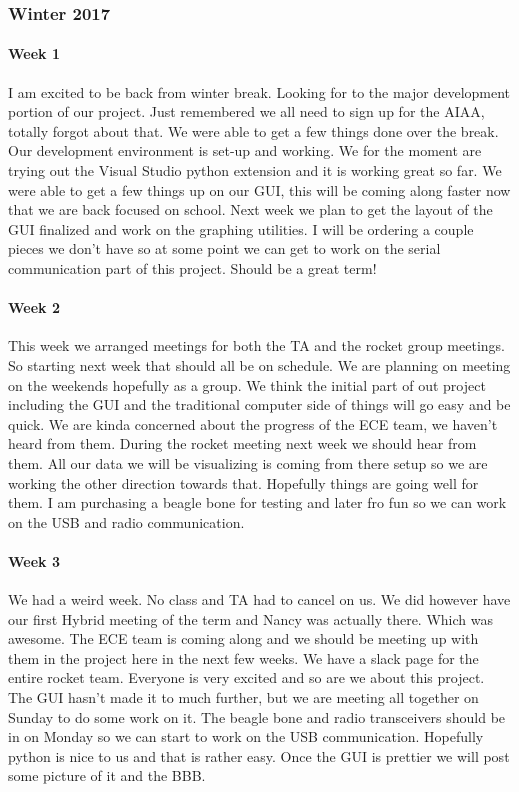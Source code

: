 \documentclass[10pt,draftclsnofoot,onecolumn,retainorgcmds]{IEEEtran}
\begin{document}
\subsubsection{Winter 2017}
\paragraph{Week 1}
I am excited to be back from winter break. Looking for to the major development portion of our project. Just remembered we all need to sign up for the AIAA, totally forgot about that. We were able to get a few things done over the break. Our development environment is set-up and working. We for the moment are trying out the Visual Studio python extension and it is working great so far. We were able to get a few things up on our GUI, this will be coming along faster now that we are back focused on school. Next week we plan to get the layout of the GUI finalized and work on the graphing utilities. I will be ordering a couple pieces we don't have so at some point we can get to work on the serial communication part of this project. Should be a great term! \\
\paragraph{Week 2}
 This week we arranged meetings for both the TA and the rocket group meetings. So starting next week that should all be on schedule. We are planning on meeting on the weekends hopefully as a group. We think the initial part of out project including the GUI and the traditional computer side of things will go easy and be quick. We are kinda concerned about the progress of the ECE team, we haven't heard from them. During the rocket meeting next week we should hear from them. All our data we will be visualizing is coming from there setup so we are working the other direction towards that. Hopefully things are going well for them. I am purchasing a beagle bone for testing and later fro fun so we can work on the USB and radio communication. \\
\paragraph{Week 3}		
We had a weird week. No class and TA had to cancel on us. We did however have our first Hybrid meeting of the term and Nancy was actually there. Which was awesome. The ECE team is coming along and we should be meeting up with them in the project here in the next few weeks. We have a slack page for the entire rocket team. Everyone is very excited and so are we about this project. The GUI hasn't made it to much further, but we are meeting all together on Sunday to do some work on it. The beagle bone and radio transceivers should be in on Monday so we can start to work on the USB communication. Hopefully python is nice to us and that is rather easy. Once the GUI is prettier we will post some picture of it and the BBB. \\
\end{document}
